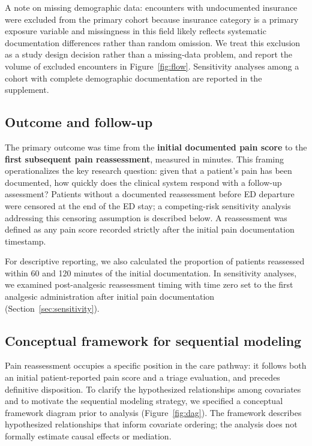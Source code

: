 \documentclass[11pt]{article}
\begin{document}
A note on missing demographic data: encounters with undocumented insurance were excluded from the primary cohort because insurance category is a primary exposure variable and missingness in this field likely reflects systematic documentation differences rather than random omission.
We treat this exclusion as a study design decision rather than a missing-data problem, and report the volume of excluded encounters in Figure~\ref{fig:flow}.
Sensitivity analyses among a cohort with complete demographic documentation are reported in the supplement.

\subsection{Outcome and follow-up}

The primary outcome was time from the \textbf{initial documented pain score} to the \textbf{first subsequent pain reassessment}, measured in minutes.
This framing operationalizes the key research question: given that a patient's pain has been documented, how quickly does the clinical system respond with a follow-up assessment?
Patients without a documented reassessment before ED departure were censored at the end of the ED stay; a competing-risk sensitivity analysis addressing this censoring assumption is described below.
A reassessment was defined as any pain score recorded strictly after the initial pain documentation timestamp.

For descriptive reporting, we also calculated the proportion of patients reassessed within 60 and 120 minutes of the initial documentation.
In sensitivity analyses, we examined post-analgesic reassessment timing with time zero set to the first analgesic administration after initial pain documentation (Section~\ref{sec:sensitivity}).

\subsection{Conceptual framework for sequential modeling}
\label{sec:framework}

Pain reassessment occupies a specific position in the care pathway: it follows both an initial patient-reported pain score and a triage evaluation, and precedes definitive disposition.
To clarify the hypothesized relationships among covariates and to motivate the sequential modeling strategy, we specified a conceptual framework diagram prior to analysis (Figure~\ref{fig:dag}).
The framework describes hypothesized relationships that inform covariate ordering; the analysis does not formally estimate causal effects or mediation.
\end{document}
